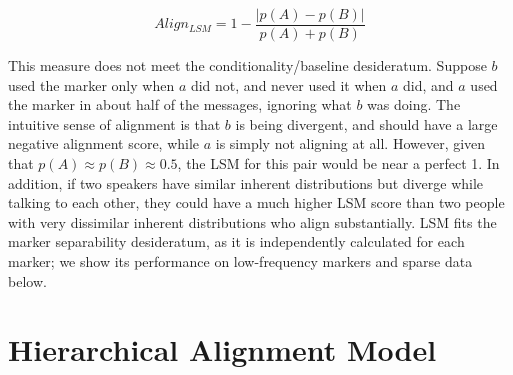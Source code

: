 \documentclass{acm_proc_article-sp}
\begin{document}
\begin{equation}
Align_{LSM} = 1 - \frac{|p(A)-p(B)|}{p(A)+p(B)}
\end{equation}

This measure does not meet the conditionality/baseline desideratum. Suppose $b$ used the marker only when $a$ did not, and never used it when $a$ did, and $a$ used the marker in about half of the messages, ignoring what $b$ was doing.  The intuitive sense of alignment is that $b$ is being divergent, and should have a large negative alignment score, while $a$ is simply not aligning at all. However, given that $p(A) \approx p(B) \approx 0.5$, the LSM for this pair would be near a perfect 1.  In addition, if two speakers have similar inherent distributions but diverge while talking to each other, they could have a much higher LSM score than two people with very dissimilar inherent distributions who align substantially. LSM fits the marker separability desideratum, as it is independently calculated for each marker; we show its performance on low-frequency markers and sparse data below. 





\section{Hierarchical Alignment Model}
\end{document}
